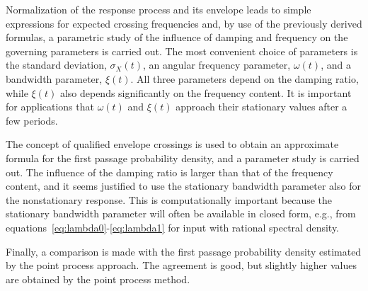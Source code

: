 \documentclass[12pt]{article}
\begin{document}
Normalization of the response process and its envelope leads to simple expressions for expected crossing frequencies and, by use of the previously derived formulas, a parametric study of the influence of damping and frequency on the governing parameters is carried out. The most convenient choice of parameters is the standard deviation, $\sigma_X(t)$, an angular frequency parameter, $\omega(t)$, and a bandwidth parameter, $\xi(t)$. All three parameters depend on the damping ratio, while $\xi(t)$ also depends significantly on the frequency content. It is important for applications that $\omega(t)$ and $\xi(t)$ approach their stationary values after a few periods.

The concept of qualified envelope crossings is used to obtain an approximate formula for the first passage probability density, and a parameter study is carried out. The influence of the damping ratio is larger than that of the frequency content, and it seems justified to use the stationary bandwidth parameter also for the nonstationary response. This is computationally important because the stationary bandwidth parameter will often be available in closed form, e.g., from equations~\eqref{eq:lambda0}-\eqref{eq:lambda1} for input with rational spectral density.

Finally, a comparison is made with the first passage probability density estimated by the point process approach. The agreement is good, but slightly higher values are obtained by the point process method.

\newpage
\end{document}
